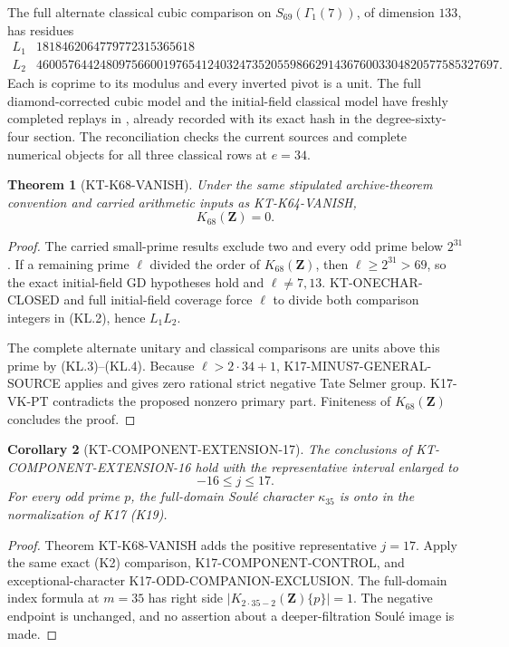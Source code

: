 \documentclass[11pt,a4paper]{article}
\newtheorem{theorem}{Theorem}[section]
\newtheorem{corollary}[theorem]{Corollary}
\theoremstyle{definition}
\begin{document}
The full alternate classical cubic comparison on
$S_{69}(\Gamma_1(7))$, of dimension $133$, has residues
\[
\begin{array}{c|r}
 L_1&1818462064779772315365618\\
 L_2&4600576442480975660019765412403247352055986629143676003304820577585327697.
\end{array}                                                    \tag{KL.4}
\]
Each is coprime to its modulus and every inverted pivot is a
unit.  The full diamond-corrected cubic model and the
initial-field classical model have freshly completed replays
in , already recorded with
its exact hash in the degree-sixty-four section.  The
reconciliation checks the current sources and complete
numerical objects for all three classical rows at $e=34$.

\begin{theorem}[KT-K68-VANISH]
\label{thm:kt-k68-vanish}
Under the same stipulated archive-theorem convention and
carried arithmetic inputs as KT-K64-VANISH,
\[
                              K_{68}(\mathbf Z)=0.
\]
\end{theorem}
\begin{proof}
The carried small-prime results exclude two and every odd
prime below $2^{31}$.  If a remaining prime $\ell$ divided
the order of $K_{68}(\mathbf Z)$, then
$\ell\geq2^{31}>69$, so the exact initial-field GD
hypotheses hold and $\ell\ne7,13$.  KT-ONECHAR-CLOSED
and full initial-field coverage force $\ell$ to divide
both comparison integers in (KL.2), hence $L_1L_2$.

The complete alternate unitary and classical comparisons
are units above this prime by (KL.3)--(KL.4).  Because
$\ell>2\cdot34+1$, K17-MINUS7-GENERAL-SOURCE applies
and gives zero rational strict negative Tate Selmer group.
K17-VK-PT contradicts the proposed nonzero primary part.
Finiteness of $K_{68}(\mathbf Z)$ concludes the proof.
\end{proof}

\begin{corollary}[KT-COMPONENT-EXTENSION-17]
The conclusions of KT-COMPONENT-EXTENSION-16 hold with
the representative interval enlarged to
\[
                             -16\leq j\leq17.
\]
For every odd prime $p$, the full-domain Soul\'e character
$\kappa_{35}$ is onto in the normalization of K17 (K19).
\end{corollary}
\begin{proof}
Theorem KT-K68-VANISH adds the positive representative
$j=17$.  Apply the same exact (K2) comparison,
K17-COMPONENT-CONTROL, and exceptional-character
K17-ODD-COMPANION-EXCLUSION.  The full-domain index
formula at $m=35$ has right side
$|K_{2\cdot35-2}(\mathbf Z)\{p\}|=1$.
The negative endpoint is unchanged, and no assertion about
a deeper-filtration Soul\'e image is made.
\end{proof}
\end{document}
